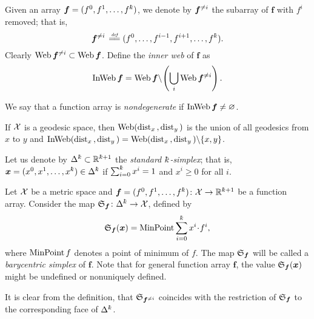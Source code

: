 Given an array $\bm{f}=(f^0,f^1,\dots,f^\kay)$,
we denote by $\bm{f}^{{\neq} i}$ the subarray of $\bm{f}$ with $f^i$ removed;
that is, 
\[\bm{f}^{\without i\,}\df(f^0,\dots,f^{i-1},f^{i+1},\dots,f^\kay).\]
Clearly 
$\Web\bm{f}^{\without i}\subset \Web\bm{f}$.
Define the \emph{inner web} of $\bm{f}$ 
as 
\[\mathop{\rm InWeb}\nolimits\bm{f}
=
\mathop{\rm Web}\nolimits\bm{f}\backslash\hskip-0.1em\left(\bigcup_{i}\mathop{\rm Web}\nolimits\bm{f}^{{\neq} i}\right).\]


We say that a function array is \emph{nondegenerate} 
if $\mathop{\rm InWeb}\nolimits\bm{f}\not=\varnothing$.

If $\mathcal{X}$ is a geodesic space, 
then $\mathop{\rm Web}\nolimits(\mathop{\rm dist}\nolimits_{x}{}{},\mathop{\rm dist}\nolimits_{y}{}{})$ is the union of all geodesics from $x$ to $y$ and 
$\mathop{\rm InWeb}\nolimits(\mathop{\rm dist}\nolimits_{x}{}{},\mathop{\rm dist}\nolimits_{y}{}{})=\mathop{\rm Web}\nolimits(\mathop{\rm dist}\nolimits_{x}{}{},\mathop{\rm dist}\nolimits_{y}{}{})\backslash\{x,y\}$.

Let us denote by $\Delta^\kay\subset \RR^{\kay+1}$ 
the \emph{standard $\kay$-simplex}; 
that is, $\bm{x}=(x^0,x^1,\dots,x^\kay)\in\Delta^\kay$ if $\sum_{i=0}^\kay x^i=1$ and $x^i\ge0$ for all $i$.

Let $\mathcal{X}$ be a metric space 
and $\bm{f}=(f^0,f^1,\dots,f^\kay)\:\spc{X}\to \RR^{\kay+1}$ be a function array.
Consider the map $\spx{\bm{f}}\:\Delta^\kay\to \spc{X}$, defined by 
\[\spx{\bm{f}}(\bm{x})=\argmin\sum_{i=0}^\kay x^i\cdot f^i,\]
where $\mathop{\rm MinPoint} f$\index{$\argmin$} denotes a point of minimum of $f$.
The map $\mathfrak{S}_{\bm{f}}$ will be called a \emph{barycentric simplex} of $\bm{f}$.
Note that for general function array $\bm{f}$, 
the value $\mathfrak{S}_{\bm{f}}(\bm{x})$ might be undefined or nonuniquely defined.

It is clear from the  definition, that $\mathfrak{S}_{\bm{f}^{{\neq} i}}$ 
coincides with the restriction of $\mathfrak{S}_{\bm{f}}$ to the corresponding face of $\Delta^\kay$.


